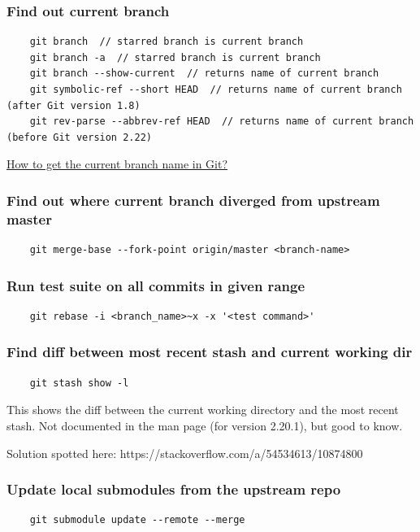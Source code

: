 \documentclass{git_course}
\begin{document}
\begin{frame}[fragile]
    \frametitle{Find out current branch}
    \begin{lstlisting}
    git branch  // starred branch is current branch
    git branch -a  // starred branch is current branch
    git branch --show-current  // returns name of current branch
    git symbolic-ref --short HEAD  // returns name of current branch (after Git version 1.8)
    git rev-parse --abbrev-ref HEAD  // returns name of current branch (before Git version 2.22)
    \end{lstlisting}
    \href{https://stackoverflow.com/questions/6245570/how-to-get-the-current-branch-name-in-git}{How to get the current branch name in Git?}
\end{frame}

\begin{frame}[fragile]
    \frametitle{Find out where current branch diverged from upstream master}
    \begin{lstlisting}
    git merge-base --fork-point origin/master <branch-name>
    \end{lstlisting}
\end{frame}

\begin{frame}[fragile]
    \frametitle{Run test suite on all commits in given range}
    \begin{lstlisting}
    git rebase -i <branch_name>~x -x '<test command>'
    \end{lstlisting}
\end{frame}

\begin{frame}[fragile]
    \frametitle{Find diff between most recent stash and current working dir}
    \begin{lstlisting}
    git stash show -l
    \end{lstlisting}

    This shows the diff between the current working directory and the most
    recent stash. Not documented in the  man page (for version
    2.20.1), but good to know.

    Solution spotted here: https://stackoverflow.com/a/54534613/10874800
\end{frame}

\begin{frame}[fragile]
    \frametitle{Update local submodules from the upstream repo}

    \begin{lstlisting}
    git submodule update --remote --merge
    \end{lstlisting}
\end{frame}
\end{document}
